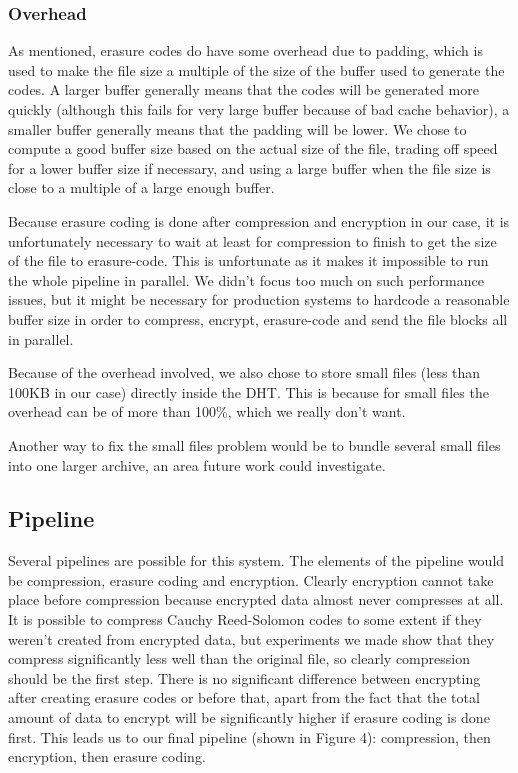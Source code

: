 \documentclass[11pt]{IEEEtran}
\begin{document}
\subsubsection{Overhead}

As mentioned, erasure codes do have some overhead due to padding, which is used to make the file size a multiple of the size of the buffer used to generate the codes. A larger buffer generally means that the codes will be generated more quickly (although this fails for very large buffer because of bad cache behavior), a smaller buffer generally means that the padding will be lower. We chose to compute a good buffer size based on the actual size of the file, trading off speed for a lower buffer size if necessary, and using a large buffer when the file size is close to a multiple of a large enough buffer.

Because erasure coding is done after compression and encryption in our case, it is unfortunately necessary to wait at least for compression to finish to get the size of the file to erasure-code. This is unfortunate as it makes it impossible to run the whole pipeline in parallel. We didn't focus too much on such performance issues, but it might be necessary for production systems to hardcode a reasonable buffer size in order to compress, encrypt, erasure-code and send the file blocks all in parallel. 

Because of the overhead involved, we also chose to store small files (less than 100KB in our case) directly inside the DHT. This is because for small files the overhead can be of more than 100\%, which we really don't want.

Another way to fix the small files problem would be to bundle several small files into one larger archive, an area future work could investigate.

\subsection{Pipeline}

Several pipelines are possible for this system. The elements of the pipeline would be compression, erasure coding and encryption. Clearly encryption cannot take place before compression because encrypted data almost never compresses at all. It is possible to compress Cauchy Reed-Solomon codes to some extent if they weren't created from encrypted data, but experiments we made show that they compress significantly less well than the original file, so clearly compression should be the first step. There is no significant difference between encrypting after creating erasure codes or before that, apart from the fact that the total amount of data to encrypt will be significantly higher if erasure coding is done first. This leads us to our final pipeline (shown in Figure 4): compression, then encryption, then erasure coding.
\end{document}
